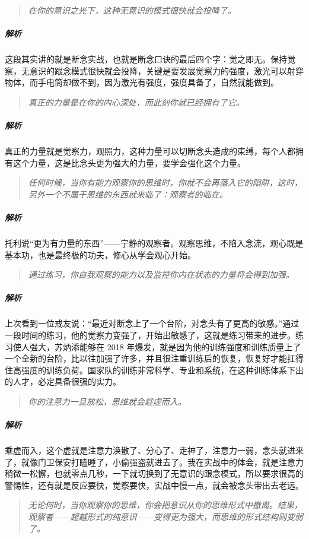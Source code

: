 \begin{quote}\it
    在你的意识之光下，这种无意识的模式很快就会投降了。
\end{quote}

\subparagraph{解析} 这段其实讲的就是断念实战，也就是断念口诀的最后四个字：觉之即无。保持觉察，无意识的跟念模式很快就会投降，关键是要发展觉察力的强度，激光可以射穿物体，而手电筒却做不到，因为激光有强度，强度具备了，自然就能做到。

\begin{quote}\it
    真正的力量是在你的内心深处，而此刻你就已经拥有了它。
\end{quote}

\subparagraph{解析} 真正的力量就是觉察力，观照力，这种力量可以切断念头造成的束缚，每个人都拥有这个力量，这是比念头更为强大的力量，要学会强化这个力量。

\begin{quote}\it
    任何时候，当你有能力观察你的思维时，你就不会再落入它的陷阱，这时，另外一个不属于思维的东西就来临了：观察者的临在。
\end{quote}

\subparagraph{解析} 托利说“更为有力量的东西”——宁静的观察者。观察思维，不陷入念流，观心既是基本功，也是最终极的功夫，修心从学会观心开始。

\begin{quote}\it
    通过练习，你自我观察的能力以及监控你内在状态的力量将会得到加强。
\end{quote}

\subparagraph{解析} 上次看到一位戒友说：“最近对断念上了一个台阶，对念头有了更高的敏感。”通过一段时间的练习，他的觉察力变强了，开始出敏感了，这就是练习带来的进步。练习使人强大，苏炳添能够在 2018 年爆发，就是因为他的训练强度和训练质量上了一个全新的台阶，比以往加强了许多，并且很注重训练后的恢复，恢复好才能扛得住高强度的训练负荷。国家队的训练非常科学、专业和系统，在这种训练体系下出的人才，必定具备很强的实力。

\begin{quote}\it
    你的注意力一旦放松，思维就会趁虚而入。
\end{quote}

\subparagraph{解析} 乘虚而入，这个虚就是注意力涣散了、分心了、走神了，注意力一弱，念头就进来了，就像门卫保安打瞌睡了，小偷强盗就进去了。我在实战中的体会，就是注意力稍微一松懈，也就零点几秒，一下就切换到了无意识的跟念模式，所以要求很高的警惕性，还有就是反应要快，觉察要快，实战中慢一点，就会被念头带出去老远。

\begin{quote}\it
    无论何时，当你观察你的思维，你会把意识从你的思维形式中撤离。结果，观察者——超越形式的纯意识——变得更为强大，而思维的形式结构则变弱了。
\end{quote}

